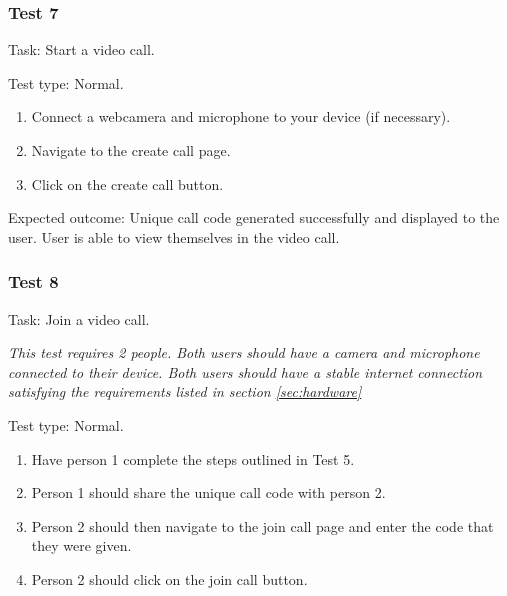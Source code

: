 \subsubsection{Test 7}

{\sffamily Task:} Start a video call.\\

{\color{gray} \hrulefill}

{\sffamily Test type: Normal.}\\

\begin{enumerate}
  \item Connect a webcamera and microphone to your device (if necessary).
  \item Navigate to the create call page.
  \item Click on the create call button.
\end{enumerate}

{\sffamily Expected outcome:} Unique call code generated successfully
and displayed to the user. User is able to view themselves in
the video call.\\

{\color{gray} \hrulefill}

\vspace{0.2cm}

\subsubsection{Test 8}

{\sffamily Task:} Join a video call.\\ \vspace{0.2cm}

\textit{This test requires 2 people. Both users should have a camera
and microphone connected to their device. Both users should have a
stable internet connection satisfying the requirements listed in section \ref{sec:hardware}}\\

{\color{gray} \hrulefill}

{\sffamily Test type: Normal.}\\

\begin{enumerate}
  \item Have person 1 complete the steps outlined in Test 5.
  \item Person 1 should share the unique call code with person 2.
  \item Person 2 should then navigate to the join call page and enter the code that they were given.
  \item Person 2 should click on the join call button.
\end{enumerate}

